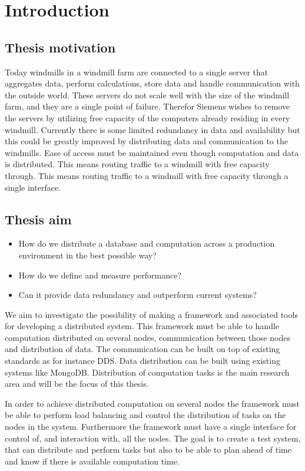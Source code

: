 \chapter{Introduction}

\section{Thesis motivation}
Today windmills in a windmill farm are connected to a single server that aggregates data, perform calculations, store data and handle communication with the outside world. 
These servers do not scale well with the size of the windmill farm, and they are a single point of failure. 
Therefor Siemens wishes to remove the servers by utilizing free capacity of the computers already residing in every windmill. 
Currently there is some limited redundancy in data and availability but this could be greatly improved by distributing data and communication to the windmills. 
Ease of access must be maintained even though computation and data is distributed. 
This means routing traffic to a windmill with free capacity through. 
This means routing traffic to a windmill with free capacity through  a single interface.

\section{Thesis aim}

\begin{itemize}
	\item How do we distribute a database and computation across a production environment in the best possible way?
	\item How do we define and measure performance?
	\item Can it provide data redundancy and outperform current systems?
	

\end{itemize}

We aim to investigate the possibility of making a framework and associated tools for developing a distributed system. 
This framework must be able to handle computation distributed on several nodes, communication between those nodes and distribution of data. 
The communication can be built on top of existing standards as for instance DDS. Data distribution can be built using existing systems like MongoDB. 
Distribution of computation tasks is the main research area and will be the focus of this thesis.

In order to achieve distributed computation on several nodes the framework must be able to perform load balancing and control the distribution of tasks on the nodes in the system. 
Furthermore the framework must have a single interface for control of, and interaction with, all the nodes.  
The goal is to create a test system, that can distribute and perform tasks but also to be able to plan ahead of time and know if there is available computation time.

